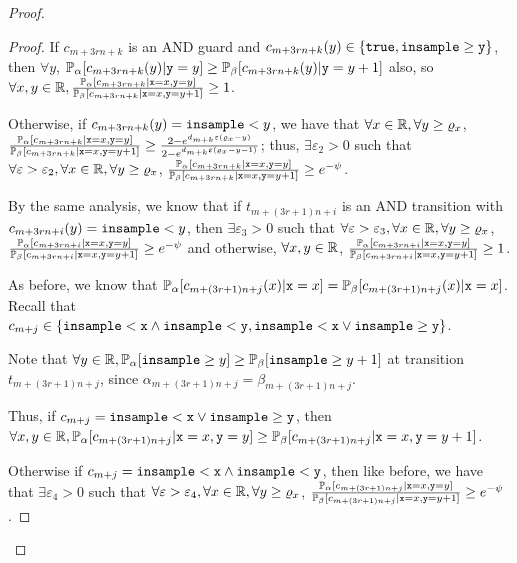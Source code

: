 \begin{proof}
\begin{proof}
		If $c_{m+3rn+k}$ is an AND guard and $c_{m+3rn+k}(y) \in \{\texttt{true}, \gguard[\texttt{y}]\}$, then $\forall y$, $\PP_\alpha[c_{m+3rn+k}(y)|\texttt{y}=y]\geq \PP_\beta[c_{m+3rn+k}(y)|\texttt{y}=y+1]$ also, so $\forall x, y\in \RR, \frac{\PP_\alpha[c_{m+3rn+k}|\texttt{x}=x, \texttt{y}=y]}{\PP_\beta[c_{m+3rn+k}|\texttt{x}=x, \texttt{y}=y+1]}\geq 1$.

		Otherwise, if $c_{m+3rn+k}(y) =\lguard[y]$, we have that $\forall x\in \RR, \forall y\geq \varrho_x$, $\frac{\PP_\alpha[c_{m+3rn+k}|\texttt{x}=x, \texttt{y}=y]}{\PP_\beta[c_{m+3rn+k}|\texttt{x}=x, \texttt{y}=y+1]} \geq \frac{2-e^{d_{m+k}\varepsilon(\varrho_x-y)}}{2-e^{d_{m+k}\varepsilon(\varrho_x-y-1)}}$; 
		thus, $\exists \varepsilon_2>0$ such that $\forall \varepsilon>\varepsilon_2, \forall x\in \RR, \forall y\geq \varrho_x$, $\frac{\PP_\alpha[c_{m+3rn+k}|\texttt{x}=x, \texttt{y}=y]}{\PP_\beta[c_{m+3rn+k}|\texttt{x}=x, \texttt{y}=y+1]}\geq e^{-\psi}$.

		By the same analysis, we know that if $t_{m+(3r+1)n+i}$ is an AND transition with $c_{m+3rn+i}(y) =\lguard[y]$, then $\exists \varepsilon_3>0$ such that $\forall \varepsilon>\varepsilon_3, \forall x\in \RR, \forall y\geq \varrho_x$, $\frac{\PP_\alpha[c_{m+3rn+i}|\texttt{x}=x, \texttt{y}=y]}{\PP_\beta[c_{m+3rn+i}|\texttt{x}=x, \texttt{y}=y+1]}\geq e^{-\psi}$ 
		and otherwise, $\forall x, y\in \RR$, $\frac{\PP_\alpha[c_{m+3rn+i}|\texttt{x}=x, \texttt{y}=y]}{\PP_\beta[c_{m+3rn+i}|\texttt{x}=x, \texttt{y}=y+1]}\geq 1$.

		As before, we know that $\PP_\alpha[c_{m+(3r+1)n+j}(x)|\texttt{x}=x]=\PP_\beta[c_{m+(3r+1)n+j}(x)|\texttt{x}=x]$. Recall that $c_{m+j}\in \{\lguard[\texttt{x}]\land \lguard[\texttt{y}], \lguard[\texttt{x}]\lor \gguard[\texttt{y}]\}$. 

		Note that $\forall y\in \RR, \PP_\alpha[\gguard[y]]\geq\PP_\beta[\gguard[y+1]]$ at transition $t_{m+(3r+1)n+j}$, since $\alpha_{m+(3r+1)n+j} = \beta_{m+(3r+1)n+j}$.

		Thus, if $c_{m+j} = \lguard[\texttt{x}]\lor \gguard[\texttt{y}]$, then $\forall x, y\in\RR, \PP_\alpha[c_{m+(3r+1)n+j}|\texttt{x}=x, \texttt{y}=y]\geq\PP_\beta[c_{m+(3r+1)n+j}|\texttt{x}=x, \texttt{y}=y+1]$.

		Otherwise if $c_{m+j} = \lguard[\texttt{x}]\land \lguard[\texttt{y}]$, then like before, we have that $\exists \varepsilon_4>0$ such that $\forall \varepsilon>\varepsilon_4, \forall x\in \RR, \forall y\geq \varrho_x$, $\frac{\PP_\alpha[c_{m+(3r+1)n+j}|\texttt{x}=x, \texttt{y}=y]}{\PP_\beta[c_{m+(3r+1)n+j}|\texttt{x}=x, \texttt{y}=y+1]}\geq e^{-\psi}$.


\end{proof}
\end{proof}
